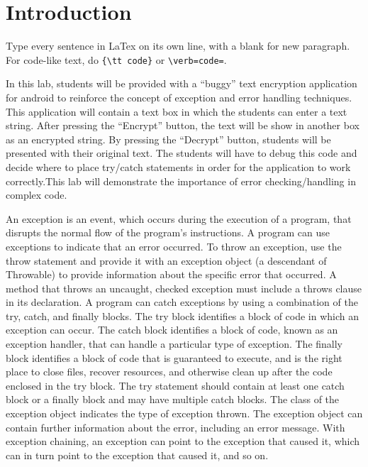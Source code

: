 \section{Introduction}

Type every sentence in LaTex on its own line, with a blank for new paragraph.
For code-like text, do \verb={\tt code}= or \verb+\verb=code=+.

In this lab, students will be provided with a “buggy” text encryption application for android to reinforce the concept of exception and error handling techniques. This application will contain a text box in which the students can enter a text string.  After pressing the “Encrypt” button, the text will be show in another box as an encrypted string. By pressing the “Decrypt” button, students will be presented with their original text. The students will have to debug this code and decide where to place try/catch statements in order for the application to work correctly.This lab will demonstrate the importance of error checking/handling in complex code.

An exception is an event, which occurs during the execution of a program, that disrupts the normal flow of the program's instructions. A program can use exceptions to indicate that an error occurred. To throw an exception, use the throw statement and provide it with an exception object (a descendant of Throwable) to provide information about the specific error that occurred. A method that throws an uncaught, checked exception must include a throws clause in its declaration. A program can catch exceptions by using a combination of the try, catch, and finally blocks. The try block identifies a block of code in which an exception can occur. The catch block identifies a block of code, known as an exception handler, that can handle a particular type of exception. The finally block identifies a block of code that is guaranteed to execute, and is the right place to close files, recover resources, and otherwise clean up after the code enclosed in the try block. The try statement should contain at least one catch block or a finally block and may have multiple catch blocks. The class of the exception object indicates the type of exception thrown. The exception object can contain further information about the error, including an error message. With exception chaining, an exception can point to the exception that caused it, which can in turn point to the exception that caused it, and so on.
